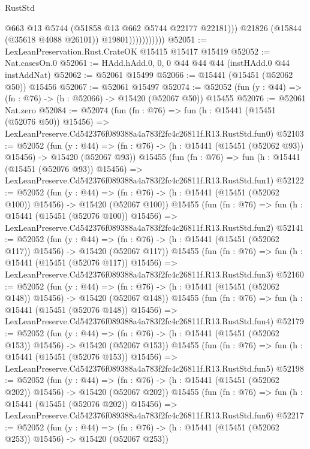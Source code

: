 \begin{lexlean}{RustStd}
\begin{coremodule}
                              @663
                              @13
                              @5744
                              (@51858 @13 @662 @5744 @22177 @22181)))
                          @21826
                          (@15844 (@35618 @4088 @26101))
                          @19801)))))))))))
@52051 := LexLeanPreservation.Rust.CrateOK @15415 @15417 @15419
@52052 := Nat.casesOn.{0}
@52061 := HAdd.hAdd.{0, 0, 0} @44 @44 @44 (instHAdd.{0} @44 instAddNat)
@52062 := @52061 @15499
@52066 := @15441 (@15451 (@52062 @50)) @15456
@52067 := @52061 @15497
@52074 := @52052 (fun (y : @44) => (fn : @76) -> (h : @52066) -> @15420 (@52067 @50)) @15455
@52076 := @52061 Nat.zero
@52084 := @52074
    (fun (fn : @76) =>
    fun (h : @15441 (@15451 (@52076 @50)) @15456) =>
    LexLeanPreserve.Cd542376f089388a4a783f2fc4c26811f.R13.RustStd.fun0)
@52103 := @52052
    (fun (y : @44) =>
    (fn : @76) -> (h : @15441 (@15451 (@52062 @93)) @15456) -> @15420 (@52067 @93))
    @15455
    (fun (fn : @76) =>
    fun (h : @15441 (@15451 (@52076 @93)) @15456) =>
    LexLeanPreserve.Cd542376f089388a4a783f2fc4c26811f.R13.RustStd.fun1)
@52122 := @52052
    (fun (y : @44) =>
    (fn : @76) -> (h : @15441 (@15451 (@52062 @100)) @15456) -> @15420 (@52067 @100))
    @15455
    (fun (fn : @76) =>
    fun (h : @15441 (@15451 (@52076 @100)) @15456) =>
    LexLeanPreserve.Cd542376f089388a4a783f2fc4c26811f.R13.RustStd.fun2)
@52141 := @52052
    (fun (y : @44) =>
    (fn : @76) -> (h : @15441 (@15451 (@52062 @117)) @15456) -> @15420 (@52067 @117))
    @15455
    (fun (fn : @76) =>
    fun (h : @15441 (@15451 (@52076 @117)) @15456) =>
    LexLeanPreserve.Cd542376f089388a4a783f2fc4c26811f.R13.RustStd.fun3)
@52160 := @52052
    (fun (y : @44) =>
    (fn : @76) -> (h : @15441 (@15451 (@52062 @148)) @15456) -> @15420 (@52067 @148))
    @15455
    (fun (fn : @76) =>
    fun (h : @15441 (@15451 (@52076 @148)) @15456) =>
    LexLeanPreserve.Cd542376f089388a4a783f2fc4c26811f.R13.RustStd.fun4)
@52179 := @52052
    (fun (y : @44) =>
    (fn : @76) -> (h : @15441 (@15451 (@52062 @153)) @15456) -> @15420 (@52067 @153))
    @15455
    (fun (fn : @76) =>
    fun (h : @15441 (@15451 (@52076 @153)) @15456) =>
    LexLeanPreserve.Cd542376f089388a4a783f2fc4c26811f.R13.RustStd.fun5)
@52198 := @52052
    (fun (y : @44) =>
    (fn : @76) -> (h : @15441 (@15451 (@52062 @202)) @15456) -> @15420 (@52067 @202))
    @15455
    (fun (fn : @76) =>
    fun (h : @15441 (@15451 (@52076 @202)) @15456) =>
    LexLeanPreserve.Cd542376f089388a4a783f2fc4c26811f.R13.RustStd.fun6)
@52217 := @52052
    (fun (y : @44) =>
    (fn : @76) -> (h : @15441 (@15451 (@52062 @253)) @15456) -> @15420 (@52067 @253))

\end{coremodule}
\end{lexlean}
